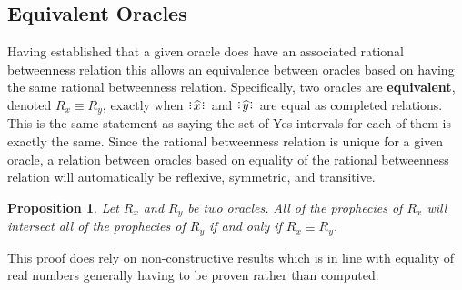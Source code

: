 \documentclass[12pt]{article}
\newtheorem{proposition}{Proposition}[section]
\begin{document}
\subsection{Equivalent Oracles}\label{os-sect-equiv}

Having established that a given oracle does have an associated rational betweenness relation this allows an equivalence between oracles based on having the same rational betweenness relation. Specifically, two oracles are \textbf{equivalent}, denoted $R_x \equiv R_y$, exactly when $\xora$ and $\xora[y]$ are equal as completed relations. This is the same statement as saying the set of Yes intervals for each of them is exactly the same. Since the rational betweenness relation is unique for a given oracle, a relation between oracles based on equality of the rational betweenness relation will automatically be reflexive, symmetric, and transitive. 

 \begin{proposition}\label{os-equal}
Let $R_x$ and $R_y$ be two oracles. All of the prophecies of $R_x$ will intersect all of the prophecies of $R_y$ if and only if $R_x \equiv R_y$.
\end{proposition}

This proof does rely on non-constructive results which is in line with equality of real numbers generally having to be proven rather than computed. 
\end{document}
